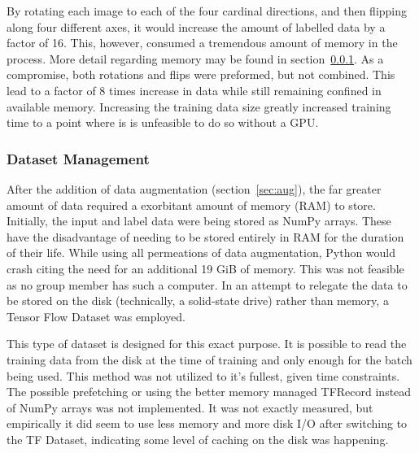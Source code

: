 \documentclass[11pt]{article}
\begin{document}
                By rotating each image to each of the four cardinal directions, and then flipping along four different axes, it would increase the amount of labelled data by a factor of 16. This, however, consumed a tremendous amount of memory in the process. More detail regarding memory may be found in section~\ref{sec:memory}. As a compromise, both rotations and flips were preformed, but not combined. This lead to a factor of 8 times increase in data while still remaining confined in available memory. Increasing the training data size greatly increased training time to a point where is is unfeasible to do so without a GPU.
                
            \subsubsection{Dataset Management}\label{sec:memory}
                After the addition of data augmentation (section~\ref{sec:aug}), the far greater amount of data required a exorbitant amount of memory (RAM) to store. Initially, the input and label data were being stored as NumPy arrays. These have the disadvantage of needing to be stored entirely in RAM for the duration of their life. While using all permeations of data augmentation, Python would crash citing the need for an additional 19 GiB of memory. This was not feasible as no group member has such a computer. In an attempt to relegate the data to be stored on the disk (technically, a solid-state drive) rather than memory, a Tensor Flow Dataset was employed. 

                This type of dataset is designed for this exact purpose. It is possible to read the training data from the disk at the time of training and only enough for the batch being used. This method was not utilized to it's fullest, given time constraints. The possible prefetching or using the better memory managed TFRecord instead of NumPy arrays was not implemented. It was not exactly measured, but empirically it did seem to use less memory and more disk I/O after switching to the TF Dataset, indicating some level of caching on the disk was happening.
\end{document}
